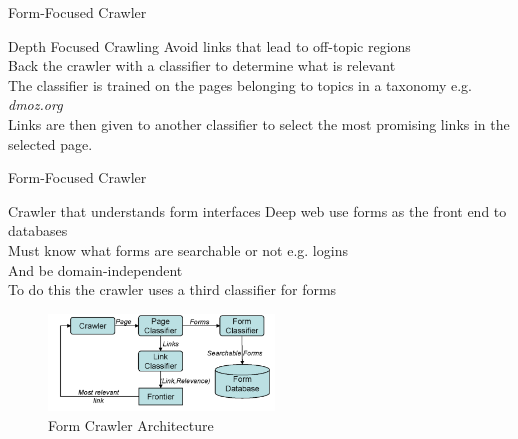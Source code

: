\documentclass{beamer}
\begin{document}
\begin{frame}{ Form-Focused Crawler}
\begin{block}{Depth Focused Crawling}
Avoid links that lead to off-topic regions \\
Back the crawler with a classifier to determine what is relevant \\
The classifier is trained on the pages belonging to topics in a taxonomy e.g. \emph{dmoz.org} \\
Links are then given to another classifier to select the most promising links in the selected page.
\end{block}
\end{frame} 
\begin{frame}{ Form-Focused Crawler}
\begin{block}{Crawler that understands form interfaces}
Deep web use forms as the front end to databases \\
Must know what forms are searchable or not e.g. logins \\
And be domain-independent \\
To do this the crawler uses a third classifier for forms
\end{block}
\begin{figure}
			\includegraphics[width=6cm]{fca.png}
			\caption{\footnotesize{Form Crawler Architecture}}
		\end{figure}
\end{frame}
\end{document}
